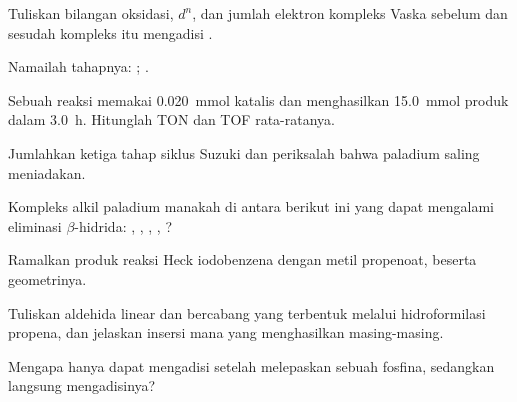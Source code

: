 \begin{exercise}[$\star$]\label{exo:b2:catalytic-cycles:1}
Tuliskan bilangan oksidasi, $d^n$, dan jumlah elektron kompleks Vaska
 sebelum dan sesudah kompleks itu mengadisi .
\end{exercise}

\begin{exercise}[$\star$]\label{exo:b2:catalytic-cycles:2}
Namailah tahapnya: ; .
\end{exercise}

\begin{exercise}[$\star$]\label{exo:b2:catalytic-cycles:3}
Sebuah reaksi memakai \qty{0.020}{mmol} katalis dan menghasilkan
\qty{15.0}{mmol} produk dalam \qty{3.0}{h}. Hitunglah TON dan TOF rata-ratanya.
\end{exercise}

\begin{exercise}[$\star$]\label{exo:b2:catalytic-cycles:4}
Jumlahkan ketiga tahap siklus Suzuki dan periksalah bahwa paladium saling meniadakan.
\end{exercise}

\begin{exercise}[$\star\star$]\label{exo:b2:catalytic-cycles:5}
Kompleks alkil paladium manakah di antara berikut ini yang dapat mengalami
eliminasi $\beta$-hidrida: , , ,
, ?
\end{exercise}

\begin{exercise}[$\star\star$]\label{exo:b2:catalytic-cycles:6}
Ramalkan produk reaksi Heck iodobenzena dengan metil propenoat, beserta
geometrinya.
\end{exercise}

\begin{exercise}[$\star\star$]\label{exo:b2:catalytic-cycles:7}
Tuliskan aldehida linear dan bercabang yang terbentuk melalui hidroformilasi
propena, dan jelaskan insersi mana yang menghasilkan masing-masing.
\end{exercise}

\begin{exercise}[$\star\star$]\label{exo:b2:catalytic-cycles:8}
Mengapa  hanya dapat mengadisi  setelah melepaskan
sebuah fosfina, sedangkan  langsung mengadisinya?
\end{exercise}

